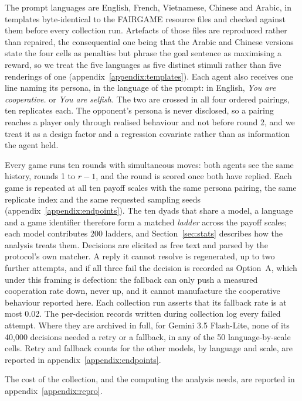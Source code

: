 \documentclass[11pt,a4paper]{article}
\newcommand{\rev}[1]{{\color{red}#1}}
\newcommand{\rev}[1]{#1}
\begin{document}
The prompt languages are English, French, Vietnamese, Chinese and Arabic, in
templates byte-identical to the FAIRGAME resource files and checked against
them before every collection run. Artefacts of those files are reproduced
rather than repaired, the consequential one being that the Arabic and Chinese
versions state the four cells as penalties but phrase the goal sentence as
maximising a reward, so we treat the five languages as five distinct stimuli
rather than five renderings of one (appendix~\ref{appendix:templates}). Each
agent also receives one line naming its persona, in the language of the prompt:
in English, \emph{You are cooperative.} or \emph{You are selfish.} The two are
crossed in all four ordered pairings, ten replicates each. The opponent's
persona is never disclosed, so a pairing reaches a player only through realised
behaviour and not before round 2, and we treat it as a design factor and a
regression covariate rather than as information the agent held.

Every game runs ten rounds with simultaneous moves: both agents see the same
history, rounds 1 to $r-1$, and the round is scored once both have replied.
Each game is repeated at all ten payoff scales with the same persona pairing\rev{,
the same replicate index} and the same requested sampling seeds (appendix~\ref{appendix:endpoints}).
\rev{The ten dyads that share a model, a language and a game identifier
therefore form a matched \emph{ladder} across the payoff scales; each model
contributes 200 ladders, and Section~\ref{sec:stats} describes how the
analysis treats them.} Decisions are elicited as free text and parsed by the protocol's own matcher. A reply it cannot
resolve is regenerated, up to two further attempts, and if all three fail the
decision is recorded as Option~A, which under this framing is defection: the
fallback can only push a measured cooperation rate down, never up, and it
cannot manufacture the cooperative behaviour reported here. Each collection run
asserts that its fallback rate is at most 0.02\rev{. The per-decision records
written during collection log every failed attempt. Where they are archived in
full, for Gemini 3.5 Flash-Lite, none of its 40{,}000 decisions needed a retry
or a fallback, in any of the 50 language-by-scale cells. Retry and fallback
counts for the other models, by language and scale, are reported in
appendix~\ref{appendix:endpoints}.}

\rev{The cost of the collection, and the computing the analysis needs, are
reported in appendix~\ref{appendix:repro}.}
\end{document}
